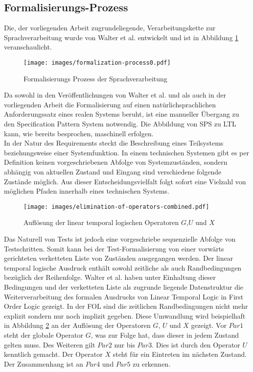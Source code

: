 \subsection{Formalisierungs-Prozess}
\label{subsec:FormProcLang}
Die, der vorliegenden Arbeit zugrundeliegende, Verarbeitungskette zur Sprachverarbeitung wurde von Walter et al. \cite{WHPR17} entwickelt und ist in Abbildung \ref{img:Form_Proc} veranschaulicht.\\
\begin{figure}[H]
	\centering
	\texttt{[image: images/formalization-process0.pdf]}
	\caption{Formalisierungs Prozess der Sprachverarbeitung \cite{WHPR17}}
	\label{img:Form_Proc}
\end{figure}
Da sowohl in den Veröffentlichungen von Walter et al. \cite{WHPR17} und \cite{WSPR17} als auch in der vorliegenden Arbeit die Formalisierung auf einen natürlichsprachlichen Anforderungssatz eines realen Systems beruht, ist eine manueller Übergang zu den Specification Pattern System notwendig.
Die Abbildung von SPS zu LTL kann, wie bereits besprochen, maschinell erfolgen.\\
In der Natur des Requirements steckt die Beschreibung eines Teilsystems beziehungsweise einer Systemfunktion. In einem technischen Systemen gibt es per Definition keinen vorgeschriebenen Abfolge von Systemzuständen, sondern abhängig von aktuellen Zustand und Eingang sind verschiedene folgende Zustände möglich. Aus dieser Entscheidungsvielfalt folgt sofort eine Vielzahl von möglichen Pfaden innerhalb eines technischen Systems.\\
\begin{figure}
	\centering
	\texttt{[image: images/elimination-of-operators-combined.pdf]}
	\caption{Auflösung der linear temporal logischen Operatoren $G$,$U$ und $X$ \cite{WHPR17}}
	\label{img:Elim_LTL}
\end{figure}
Das Naturell von Tests ist jedoch eine vorgeschriebe sequenzielle Abfolge von Testschritten. Somit kann bei der Test-Formalisierung von einer vorwärts gerichteten verketteten Liste von Zuständen ausgegangen werden. Der linear temporal logische Ausdruck enthält sowohl zeitliche als auch Randbedingungen bezüglich der Reihenfolge. Walter et al. \cite{WHPR17} haben unter Einhaltung dieser Bedingungen und der verketteten Liste als zugrunde liegende Datenstruktur die Weiterverarbeitung des formalen Ausdrucks von Linear Temporal Logic in First Order Logic gezeigt. In der FOL sind die zeitlichen Randbedingungen nicht mehr explizit sondern nur noch implizit gegeben. Diese Umwandlung wird beispielhaft in Abbildung \ref{img:Elim_LTL} an der Auflösung der Operatoren $G$, $U$ und $X$ gezeigt. Vor $Par1$ steht der globale Operator $G$, was zur Folge hat, dass dieser in jedem Zustand gelten muss. Des Weiteren gilt $Par2$ nur bis $Par3$. Dies ist durch den Operator $U$ kenntlich gemacht. Der Operator $X$ steht für ein Eintreten im nächsten Zustand. Der Zusammenhang ist an $Par4$ und $Par5$ zu erkennen.\\
